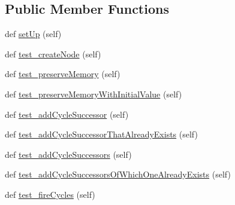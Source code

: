 \subsection*{Public Member Functions}
\begin{DoxyCompactItemize}
\item 
def \hyperlink{classNEAT__PyGenetics_1_1NEAT_1_1Tests_1_1SimulationGenomeTests_1_1test__simulationNodes_1_1TestSimulationCycleNode_ae8c352cdd9202aa02c85f6514e896e46}{set\+Up} (self)
\item 
def \hyperlink{classNEAT__PyGenetics_1_1NEAT_1_1Tests_1_1SimulationGenomeTests_1_1test__simulationNodes_1_1TestSimulationCycleNode_aff6a6b849ab9b0d2f266e46753e06bd0}{test\+\_\+create\+Node} (self)
\item 
def \hyperlink{classNEAT__PyGenetics_1_1NEAT_1_1Tests_1_1SimulationGenomeTests_1_1test__simulationNodes_1_1TestSimulationCycleNode_aa2a6c739540eaa41276a31be0c8ef619}{test\+\_\+preserve\+Memory} (self)
\item 
def \hyperlink{classNEAT__PyGenetics_1_1NEAT_1_1Tests_1_1SimulationGenomeTests_1_1test__simulationNodes_1_1TestSimulationCycleNode_a5b6c8cba78559d3d4fbe1336fda1569b}{test\+\_\+preserve\+Memory\+With\+Initial\+Value} (self)
\item 
def \hyperlink{classNEAT__PyGenetics_1_1NEAT_1_1Tests_1_1SimulationGenomeTests_1_1test__simulationNodes_1_1TestSimulationCycleNode_af290d2156db85e2109ef6722c25eb213}{test\+\_\+add\+Cycle\+Successor} (self)
\item 
def \hyperlink{classNEAT__PyGenetics_1_1NEAT_1_1Tests_1_1SimulationGenomeTests_1_1test__simulationNodes_1_1TestSimulationCycleNode_abd65f6b19f91eb3796411a7bc6f60cb0}{test\+\_\+add\+Cycle\+Successor\+That\+Already\+Exists} (self)
\item 
def \hyperlink{classNEAT__PyGenetics_1_1NEAT_1_1Tests_1_1SimulationGenomeTests_1_1test__simulationNodes_1_1TestSimulationCycleNode_ae41ca9680b1fc37c9033e68fab641eb5}{test\+\_\+add\+Cycle\+Successors} (self)
\item 
def \hyperlink{classNEAT__PyGenetics_1_1NEAT_1_1Tests_1_1SimulationGenomeTests_1_1test__simulationNodes_1_1TestSimulationCycleNode_abba2b6050d0f0b156684d6a8430595c0}{test\+\_\+add\+Cycle\+Successors\+Of\+Which\+One\+Already\+Exists} (self)
\item 
def \hyperlink{classNEAT__PyGenetics_1_1NEAT_1_1Tests_1_1SimulationGenomeTests_1_1test__simulationNodes_1_1TestSimulationCycleNode_ab3d073cdf68857190769fd380b63b842}{test\+\_\+fire\+Cycles} (self)
\end{DoxyCompactItemize}
